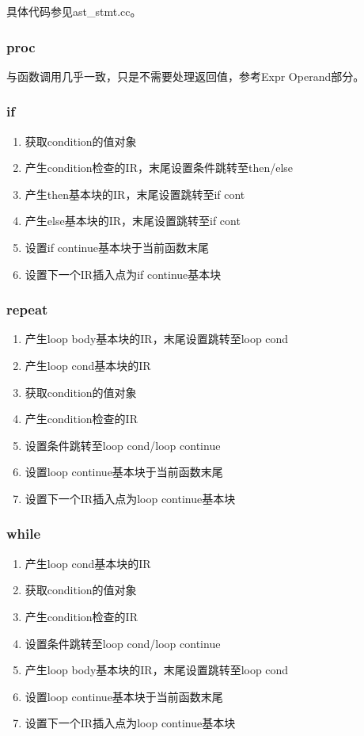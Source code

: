 \documentclass{article}
\begin{document}
\par 具体代码参见ast\_stmt.cc。

\subsubsection{proc}
\par 与函数调用几乎一致，只是不需要处理返回值，参考Expr Operand部分。

\subsubsection{if}
\begin{enumerate}
  \item 获取condition的值对象
  \item 产生condition检查的IR，末尾设置条件跳转至then/else
  \item 产生then基本块的IR，末尾设置跳转至if cont
  \item 产生else基本块的IR，末尾设置跳转至if cont
  \item 设置if continue基本块于当前函数末尾
  \item 设置下一个IR插入点为if continue基本块
\end{enumerate}

\subsubsection{repeat}
\begin{enumerate}
  \item 产生loop body基本块的IR，末尾设置跳转至loop cond
  \item 产生loop cond基本块的IR
  \item 获取condition的值对象
  \item 产生condition检查的IR
  \item 设置条件跳转至loop cond/loop continue
  \item 设置loop continue基本块于当前函数末尾
  \item 设置下一个IR插入点为loop continue基本块
\end{enumerate}

\subsubsection{while}
\begin{enumerate}
  \item 产生loop cond基本块的IR
  \item 获取condition的值对象
  \item 产生condition检查的IR
  \item 设置条件跳转至loop cond/loop continue
  \item 产生loop body基本块的IR，末尾设置跳转至loop cond
  \item 设置loop continue基本块于当前函数末尾
  \item 设置下一个IR插入点为loop continue基本块
\end{enumerate}
\end{document}
